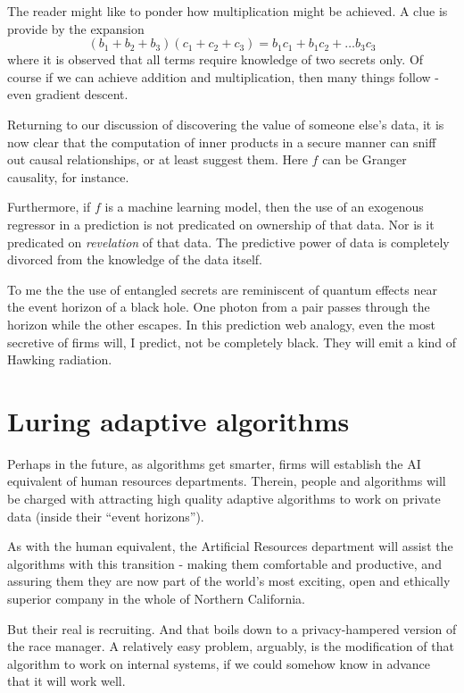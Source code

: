 The reader might like to ponder how multiplication might be achieved. A clue is provide by the expansion
$$
   (b_1 + b_2 + b_3)(c_1 + c_2 + c_3) = b_1 c_1 + b_1 c_2 + \dots b_3 c_3 
$$
where it is observed that all terms require knowledge of two secrets only. Of course if we can achieve addition and multiplication, then many things follow - even gradient descent. 

Returning to our discussion of discovering the value of someone else's data, it is now clear that the computation of inner products in a secure manner can sniff out causal relationships, or at least suggest them. Here $f$ can be Granger causality, for instance. 

Furthermore, if $f$ is a machine learning model, then the use of an exogenous regressor in a prediction is not predicated on ownership of that data. Nor is it predicated on {\em revelation} of that data. The predictive power of data is completely divorced from the knowledge of the data itself. 

To me the the use of entangled secrets are reminiscent of quantum effects near the event horizon of a black hole. One photon from a pair passes through the horizon while the other escapes. In this prediction web analogy, even the most secretive of firms will, I predict, not be completely black. They will emit a kind of Hawking radiation.

\section{Luring adaptive algorithms} 
 
Perhaps in the future, as algorithms get smarter, firms will establish the AI equivalent of human resources departments. Therein, people and algorithms will be charged with attracting high quality adaptive algorithms to work on private data (inside their ``event horizons''). 

As with the human equivalent, the Artificial Resources department will assist the algorithms with this transition - making them comfortable and productive, and assuring them they are now part of the world's most exciting, open and ethically superior company in the whole of Northern California. 

But their real is recruiting. And that boils down to a privacy-hampered version of the race manager. A relatively easy problem, arguably, is the modification of that algorithm to work on internal systems, if we could somehow know in advance that it will work well. 

